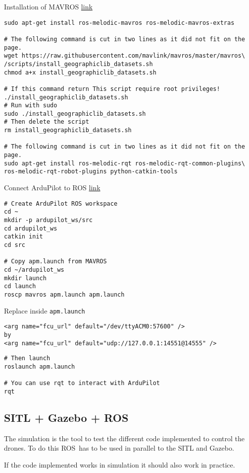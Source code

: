 Installation of MAVROS \href{http://ardupilot.org/dev/docs/ros-install.html#installing-mavros}{link}
\begin{verbatim}
sudo apt-get install ros-melodic-mavros ros-melodic-mavros-extras

# The following command is cut in two lines as it did not fit on the page.
wget https://raw.githubusercontent.com/mavlink/mavros/master/mavros\
/scripts/install_geographiclib_datasets.sh
chmod a+x install_geographiclib_datasets.sh

# If this command return This script require root privileges!
./install_geographiclib_datasets.sh
# Run with sudo
sudo ./install_geographiclib_datasets.sh
# Then delete the script
rm install_geographiclib_datasets.sh

# The following command is cut in two lines as it did not fit on the page.
sudo apt-get install ros-melodic-rqt ros-melodic-rqt-common-plugins\
ros-melodic-rqt-robot-plugins python-catkin-tools
\end{verbatim}

Connect ArduPilot to ROS \href{http://ardupilot.org/dev/docs/ros-sitl.html}{link}
\begin{verbatim}
# Create ArduPilot ROS workspace
cd ~
mkdir -p ardupilot_ws/src
cd ardupilot_ws
catkin init
cd src

# Copy apm.launch from MAVROS
cd ~/ardupilot_ws
mkdir launch
cd launch
roscp mavros apm.launch apm.launch
            \end{verbatim}

Replace inside \texttt{apm.launch}
\begin{verbatim}
<arg name="fcu_url" default="/dev/ttyACM0:57600" />
by
<arg name="fcu_url" default="udp://127.0.0.1:14551@14555" />
            \end{verbatim}

\begin{verbatim}
# Then launch
roslaunch apm.launch

# You can use rqt to interact with ArduPilot
rqt
            \end{verbatim}

\subsection{SITL + Gazebo + ROS}
The simulation is the tool to test the different code implemented to control the drones.
To do this ROS has to be used in parallel to the SITL and Gazebo.

If the code implemented works in simulation it should also work in practice.

